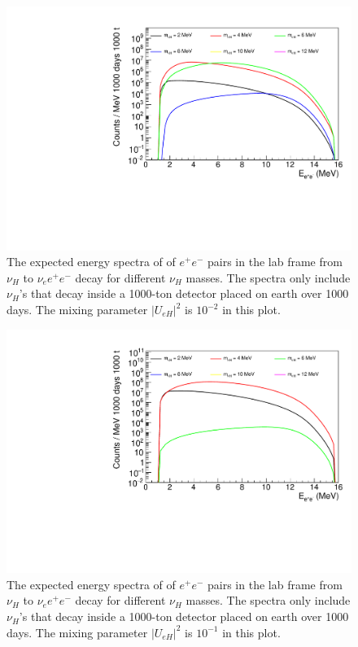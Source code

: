 \documentclass[%
 reprint,
 amsmath,amssymb,
 aps,
 prd,
floatfix,
twocolumn,
]{revtex4-1}
\begin{document}
\begin{figure}[!htbp]
\includegraphics[width=0.99\columnwidth]{../plots/EeeSpectrum_decay_in_detector_integrate_U0.01_AllMass_linXlogY.pdf}
\caption{The expected energy spectra of of $e^+e^-$ pairs in the lab frame from $\nu_H$ to $\nu_e e^+ e^-$ decay for  different $\nu_H$ masses. 
The spectra only include $\nu_H$'s that decay inside a 1000-ton detector placed on earth over 1000 days. 
The mixing parameter $|U_{eH}|^2$ is  $10^{-2}$ in this plot.}
\label{fig:EeeSpectrum_in_detector_U1em2} 
\end{figure}

\begin{figure}[!htbp]
\includegraphics[width=0.99\columnwidth]{../plots/EeeSpectrum_decay_in_detector_integrate_U0.1_AllMass_linXlogY.pdf}
\caption{The expected energy spectra of of $e^+e^-$ pairs in the lab frame from $\nu_H$ to $\nu_e e^+ e^-$ decay for  different $\nu_H$ masses. 
The spectra only include $\nu_H$'s that decay inside a 1000-ton detector placed on earth over 1000 days. 
The mixing parameter $|U_{eH}|^2$ is  $10^{-1}$ in this plot.}
\label{fig:EeeSpectrum_in_detector_U1em1} 
\end{figure}
\end{document}
